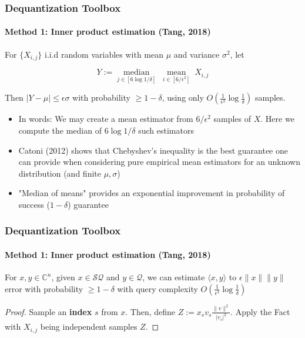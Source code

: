 \documentclass{beamer}
\newcommand\0{\mathbf{0}}
\newcommand\CC{\mathbb{C}}
\newcommand\<{\langle}
\renewcommand\>{\rangle}
\begin{document}
\begin{frame}
\frametitle{Dequantization Toolbox}
\framesubtitle{Method 1: Inner product estimation (Tang, 2018)}
\begin{fact} For $\{X_{i,j}\}$ i.i.d random variables with mean $\mu$ and variance $\sigma^2$, let 

$$Y := \underset{j \in [6\log 1/\delta]}{\operatorname{median}}\;\underset{i \in [6/\epsilon^2]}{\operatorname{mean}}\;X_{i,j}$$

Then $\vert Y - \mu\vert \leq \epsilon\sigma$ with probability $\geq 1-\delta$, using only $O(\frac{1}{\epsilon^2}\log\frac{1}{\delta})$ samples.
\end{fact}

\begin{itemize}
	\item In words: We may create a mean estimator from $6/\epsilon^2$ samples of $X$. Here we compute the median of $6\log 1/\delta$ such estimators
	\item Catoni (2012) shows that Chebyshev's inequality is the best guarantee one can provide when considering pure empirical mean estimators for an unknown distribution (and finite $\mu, \sigma$)
	\item "Median of means" provides an exponential improvement in probability of success ($1 - \delta$) guarantee
\end{itemize}
\end{frame}

\begin{frame}
\frametitle{Dequantization Toolbox}
\framesubtitle{Method 1: Inner product estimation (Tang, 2018)}
\begin{corollary} For $x,y \in\CC^n$, given $x \in \mathcal{SQ}$ and $y \in \mathcal{Q}$, we can estimate $\langle x,y\rangle$ to $\epsilon\|x\|\|y\|$ error with probability $\geq 1-\delta$ with query complexity $O(\frac{1}{\epsilon^2}\log\frac{1}{\delta})$
\end{corollary}

\begin{proof}Sample an \textbf{index} $s$ from $x$. Then, define $Z := x_s v_s\frac{\|v\|^2}{|v_s|^2}$. Apply the Fact with $X_{i,j}$ being independent samples $Z$.
\end{proof}	
\end{frame}
\end{document}
